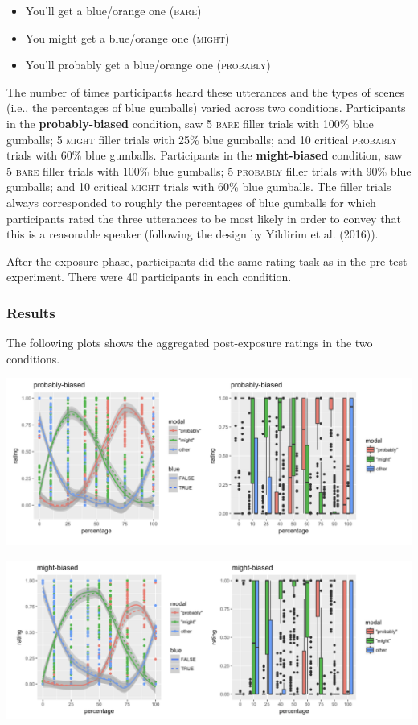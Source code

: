 \documentclass[lucida,biblatex]{sp} %
\begin{document}
\begin{itemize}
\item You'll get a blue/orange one (\textsc{bare})
\item You might get a blue/orange one (\textsc{might})
\item You'll probably get a blue/orange one (\textsc{probably})
\end{itemize}

The number of times participants heard these utterances and the types of scenes (i.e., the percentages of blue gumballs) varied across two conditions. Participants in the \textbf{probably-biased} condition, saw 5 \textsc{bare} filler trials with 100\% blue gumballs; 5 \textsc{might} filler trials with 25\% blue gumballs; and 10 critical \textsc{probably} trials with 60\% blue gumballs. Participants in the \textbf{might-biased} condition, saw  5 \textsc{bare} filler trials with 100\% blue gumballs; 5 \textsc{probably} filler trials with 90\% blue gumballs; and 10 critical \textsc{might} trials with 60\% blue gumballs. The filler trials always corresponded to roughly the percentages of blue gumballs for which participants rated the three utterances to be most likely in order to convey that this is a reasonable speaker (following the design by Yildirim et al. (2016)).

After the exposure phase, participants did the same rating task as in the pre-test experiment. There were 40 participants in each condition.

\subsubsection{Results}

The following plots shows the aggregated post-exposure ratings in the two conditions.

\begin{center}
\includegraphics[width=\textwidth]{figures/adaptation-probably-biased-results.png}

\includegraphics[width=\textwidth]{figures/adaptation-might-biased-results.png}
\vspace{2em}
\end{center}
\end{document}
